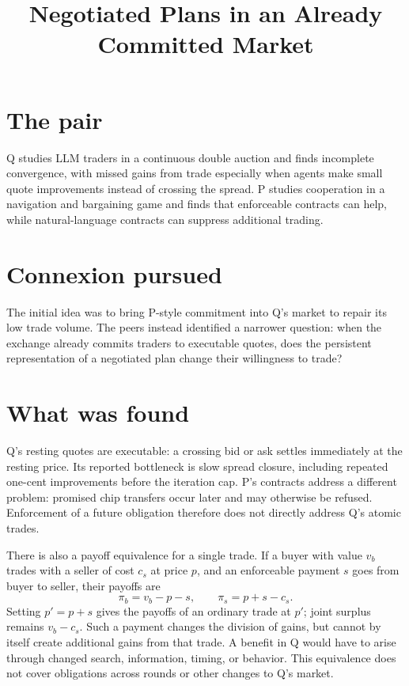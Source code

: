 \documentclass{article}
\title{Negotiated Plans in an Already Committed Market}
\begin{document}
\maketitle

\section*{The pair}

Q studies LLM traders in a continuous double auction and finds incomplete convergence, with missed gains from trade especially when agents make small quote improvements instead of crossing the spread. P studies cooperation in a navigation and bargaining game and finds that enforceable contracts can help, while natural-language contracts can suppress additional trading. 

\section*{Connexion pursued}

The initial idea was to bring P-style commitment into Q's market to repair its low trade volume. The peers instead identified a narrower question: when the exchange already commits traders to executable quotes, does the persistent representation of a negotiated plan change their willingness to trade? 

\section*{What was found}

Q's resting quotes are executable: a crossing bid or ask settles immediately at the resting price. Its reported bottleneck is slow spread closure, including repeated one-cent improvements before the iteration cap. P's contracts address a different problem: promised chip transfers occur later and may otherwise be refused. Enforcement of a future obligation therefore does not directly address Q's atomic trades. 

There is also a payoff equivalence for a single trade. If a buyer with value \(v_b\) trades with a seller of cost \(c_s\) at price \(p\), and an enforceable payment \(s\) goes from buyer to seller, their payoffs are
\[
\pi_b=v_b-p-s,\qquad \pi_s=p+s-c_s.
\]
Setting \(p'=p+s\) gives the payoffs of an ordinary trade at \(p'\); joint surplus remains \(v_b-c_s\). Such a payment changes the division of gains, but cannot by itself create additional gains from that trade. A benefit in Q would have to arise through changed search, information, timing, or behavior. This equivalence does not cover obligations across rounds or other changes to Q's market. 
\end{document}
